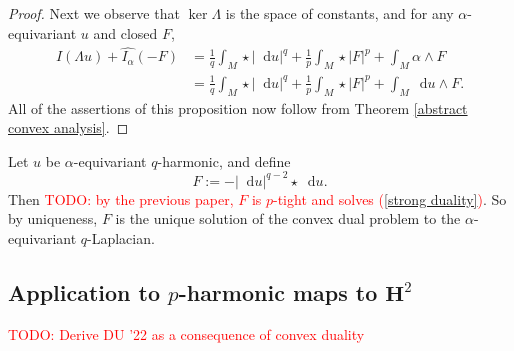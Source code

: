 \documentclass[reqno,11pt]{amsart}
\newcommand{\Hyp}{\mathbf H}
\newcommand*\dif{\mathop{}\!\mathrm{d}}
\theoremstyle{definition}
\numberwithin{equation}{section}
\newcommand\todo[1]{\textcolor{red}{TODO: #1}}
\begin{document}
\begin{proof}
Next we observe that $\ker \Lambda$ is the space of constants, and for any $\alpha$-equivariant $u$ and closed $F$,
\begin{align*}
I(\Lambda u) + \widehat{I_\alpha}(-F)
&= \frac{1}{q} \int_M \star |\dif u|^q + \frac{1}{p} \int_M \star |F|^p + \int_M \alpha \wedge F \\
&= \frac{1}{q} \int_M \star |\dif u|^q + \frac{1}{p} \int_M \star |F|^p + \int_M \dif u \wedge F.
\end{align*}
All of the assertions of this proposition now follow from Theorem \ref{abstract convex analysis}.
\end{proof}

Let $u$ be $\alpha$-equivariant $q$-harmonic, and define
\begin{equation}\label{dual solution}
	F := - |\dif u|^{q - 2} \star \dif u.
\end{equation}
Then \todo{by the previous paper, $F$ is $p$-tight and solves (\ref{strong duality})}.
So by uniqueness, $F$ is the unique solution of the convex dual problem to the $\alpha$-equivariant $q$-Laplacian.

\subsection{Application to \texorpdfstring{$p$-harmonic}{p-harmonic} maps to \texorpdfstring{$\Hyp^2$}{hyperbolic space}}
\todo{Derive DU '22 as a consequence of convex duality}



\printbibliography
\end{document}

